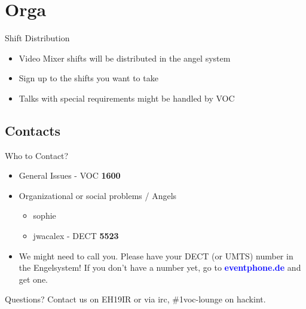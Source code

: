 \documentclass[aspectratio=169]{beamer}
\begin{document}
\section{Orga} 		
\begin{frame}{Shift Distribution}		%
\begin{itemize}
	\item Video Mixer shifts will be distributed in the angel system
	\item Sign up to the shifts you want to take
	\item Talks with special requirements might be handled by VOC
\end{itemize} 
\end{frame}

\subsection{Contacts}			%
\begin{frame}{Who to Contact?}
\begin{itemize}
	\item General Issues - VOC \textbf{1600}
	\item Organizational or social problems / Angels
	\begin{itemize}
		\item sophie
		\item jwacalex - DECT \textbf{5523}
	\end{itemize}
	\item We might need to call you. Please have your DECT (or UMTS) number in the Engelsystem! If you don't have a number yet, go to 
	\textcolor{blue}{\textbf{eventphone.de}} and get one. 
\end{itemize} 
\end{frame}

\begin{frame}{Questions?}
Contact us on EH19IR or  via irc, \#1voc-lounge on hackint.
\end{frame}
\end{document}
